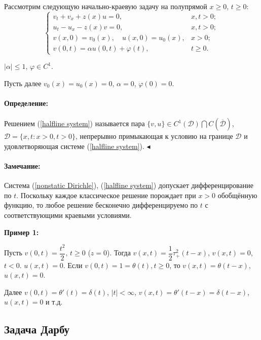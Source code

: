 \documentclass{article}
\newenvironment{definition}{ \paragraph{Определение:}}{\hfill $\blacktriangleleft$}
\newenvironment{observation}{ \paragraph{Замечание:}}{\\}
\begin{document}
Рассмотрим следующую начально-краевую задачу на полупрямой $x\geqslant 0$, $t\geqslant 0$:
\begin{equation}
\begin{cases}
    v_t + v_x + z(x) u = 0, & x,t>0;\\
    u_t - u_x - z(x) v = 0, & x,t>0;\\
    v(x,0) = v_0(x), \quad u(x,0) = u_0(x), & x >0;\\
    v(0,t) = \alpha u(0,t) + \varphi(t), & t \geqslant 0.
\end{cases}
\label{halfline system}
\end{equation}

$|\alpha| \leqslant 1$, $\varphi \in C^1$.

Пусть далее $v_0(x) = u_0(x) = 0$, $\alpha = 0$, $\varphi(0) = 0$.

\begin{definition}
Решением (\ref{halfline system}) называется пара $\{v,u\} \in C^1(\mathcal{D}) \bigcap C(\overline{\mathcal{D}})$,  $\mathcal{D} = \{x,t : x >0, t>0\}$, непрерывно примыкающая к условию на границе $\mathcal{D}$ и удовлетворяющая системе (\ref{halfline system}).
\end{definition}

\begin{observation} 
Система (\ref{nonstatic Dirichle}), (\ref{halfline system}) допускает дифференцирование по $t$. Поскольку каждое классическое решение порождает при $x>0$ обобщённую функцию, то любое решение бесконечно дифференцируемо по $t$ с соответствующими краевыми условиями.
\end{observation}


\textbf{Пример 1:} 

Пусть $v(0,t) = \dfrac{t^2}{2}$, $t\geqslant0$ ($z=0$).
Тогда $v(x,t) = \dfrac{1}{2} \tau_+^2(t-x)$, $v(x,t) = 0$, $t<0$. $u(x,t) = 0$.
Если $v(0,t) = 1 =\theta(t), t\geqslant 0$, то $v(x,t) = \theta(t-x)$, $u(x,t) = 0$.

Далее $v(0,t) = \theta'(t) = \delta(t)$, $|t|< \infty $, $v(x,t) = \theta'(t-x) = \delta(t - x)$, $u(x,t) = 0$ и т.д.

\subsection*{Задача Дарбу}
\end{document}
